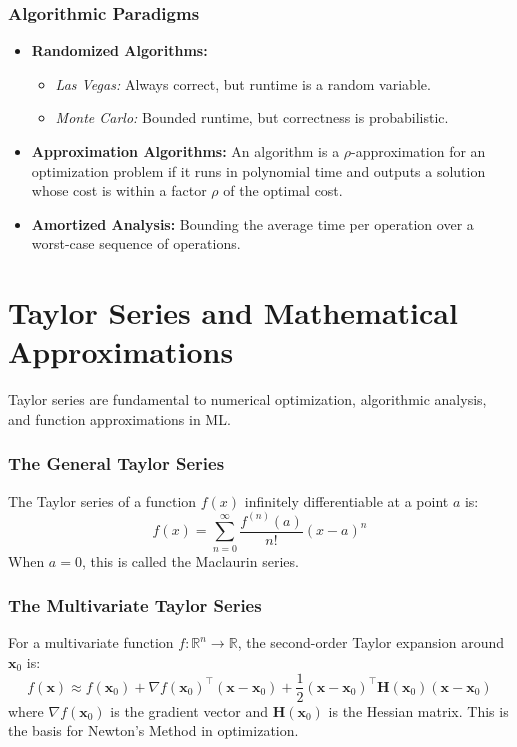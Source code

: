 \documentclass[11pt]{article}
\begin{document}
\section{Algorithmic Paradigms}
\begin{itemize}
    \item \textbf{Randomized Algorithms:}
    \begin{itemize}
        \item \emph{Las Vegas:} Always correct, but runtime is a random variable.
        \item \emph{Monte Carlo:} Bounded runtime, but correctness is probabilistic.
    \end{itemize}
    \item \textbf{Approximation Algorithms:} An algorithm is a \(\rho\)-approximation for an optimization problem if it runs in polynomial time and outputs a solution whose cost is within a factor \(\rho\) of the optimal cost.
    \item \textbf{Amortized Analysis:} Bounding the average time per operation over a worst-case sequence of operations.
\end{itemize}

\hrulefill

\part{Taylor Series and Mathematical Approximations}

Taylor series are fundamental to numerical optimization, algorithmic analysis, and function approximations in ML.

\section{The General Taylor Series}
The Taylor series of a function \(f(x)\) infinitely differentiable at a point \(a\) is:
\[
 f(x) = \sum_{n=0}^{\infty} \frac{f^{(n)}(a)}{n!} (x - a)^n 
\]
When \(a = 0\), this is called the Maclaurin series.

\section{The Multivariate Taylor Series}
For a multivariate function \(f: \mathbb{R}^n \to \mathbb{R}\), the second-order Taylor expansion around \(\mathbf{x}_0\) is:
\[
 f(\mathbf{x}) \approx f(\mathbf{x}_0) + \nabla f(\mathbf{x}_0)^\top (\mathbf{x} - \mathbf{x}_0) + \frac{1}{2} (\mathbf{x} - \mathbf{x}_0)^\top \mathbf{H}(\mathbf{x}_0) (\mathbf{x} - \mathbf{x}_0) 
\]
where \(\nabla f(\mathbf{x}_0)\) is the gradient vector and \(\mathbf{H}(\mathbf{x}_0)\) is the Hessian matrix. This is the basis for Newton's Method in optimization.
\end{document}
